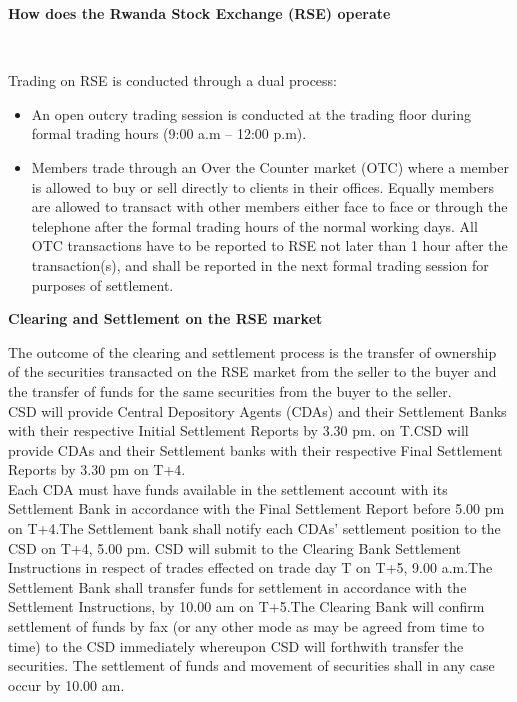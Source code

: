 \documentclass{article}
\begin{document}
\begin{titlepage}
  \begin{titlepage}
  \setcounter{page}{4}
    \begin{center}
  \textbf{\huge{How does the Rwanda Stock Exchange (RSE) operate}}
    \end{center}
   \\
   \Large
   
   Trading on RSE is conducted through a dual process:   \vspace{0.3cm}
    \begin{itemize}
       \item 
       An open outcry trading session is conducted at the trading floor during formal trading hours (9:00 a.m – 12:00 p.m).
       \item 
       Members trade through an Over the Counter market (OTC) where a member is allowed to buy or sell directly to clients in their offices. Equally members are allowed to transact with other members either face to face or through the telephone after the formal trading hours of the normal working days.  All OTC transactions have to be reported to RSE not later than 1 hour after the transaction(s), and shall be reported in the next formal trading session for purposes of settlement. 
       
   \end{itemize}

 

   \begin{flushleft}
             \textbf{Clearing and Settlement on the RSE market}
   \vspace{0.3cm}  
   
   The outcome of the clearing and settlement process is the transfer of ownership of the securities transacted on the RSE market from the seller to the buyer and the transfer of funds for the same securities from the buyer to the seller. 
\\

 CSD will provide Central Depository Agents (CDAs) and their Settlement Banks with their respective Initial Settlement Reports by 3.30 pm. on T.CSD will provide CDAs and their Settlement banks with their respective Final Settlement Reports by 3.30 pm on T+4.
\\

Each CDA must have funds available in the settlement account with its Settlement Bank in accordance with the Final Settlement Report before 5.00 pm on T+4.The Settlement bank shall notify each CDAs' settlement position to the CSD on T+4, 5.00  pm. CSD will submit to the Clearing  Bank Settlement Instructions in respect of trades effected on trade day T on T+5, 9.00 a.m.The Settlement Bank shall transfer funds for settlement in accordance with the Settlement Instructions, by 10.00 am on T+5.The Clearing Bank will confirm settlement of funds by fax (or any other mode as may be agreed from time to time) to the CSD immediately whereupon CSD will forthwith transfer the securities. The settlement of funds and movement of securities shall in any case occur by 10.00 am.
  \end{flushleft}
  



\end{titlepage}
\end{titlepage}
\end{document}
